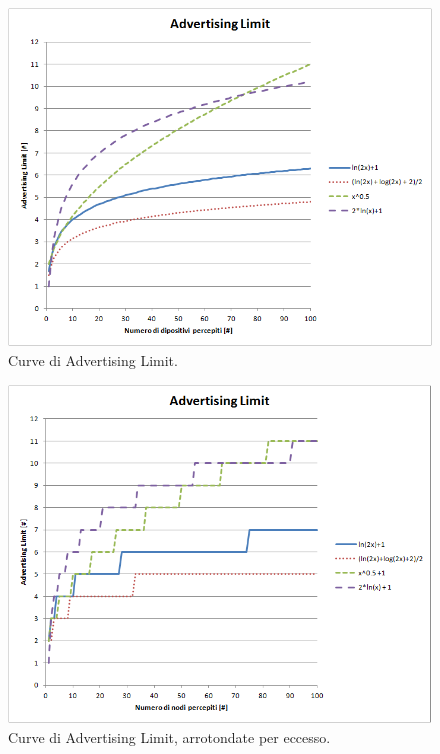 \begin{figure}
	\centering
	\includegraphics[width=0.9\linewidth]{Images/grafici_usati/AL_curve_no_arr}
	\caption[AL]{Curve di Advertising Limit.}
	\label{fig:AL_curve_no_arr}
\end{figure}

\begin{figure}[t]
	\centering
	\includegraphics[width=0.9\linewidth]{Images/grafici_usati/AL_curve_arr}
	\caption[AL arrotondato]{Curve di Advertising Limit, arrotondate per eccesso.}
	\label{fig:AL_curve_arr}
\end{figure}
